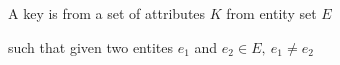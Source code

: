 \documentclass[preview]{standalone}
\begin{document}
A key is from a set of attributes $K$ from entity set $E$

such that given two entites $e_1$ and $e_2 \in E,\ e_1 \not = e_2$

\end{document}

